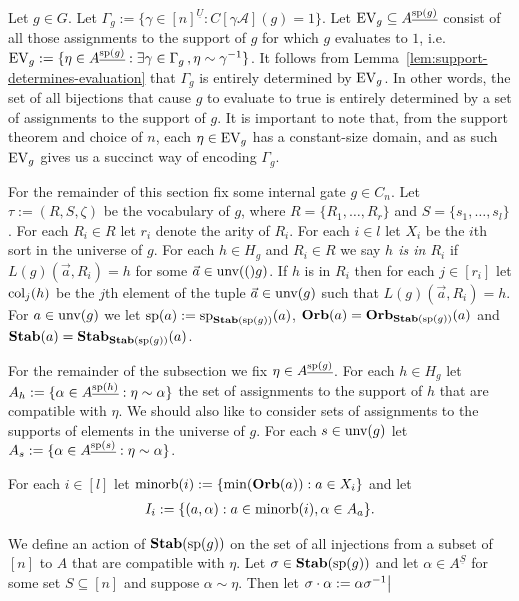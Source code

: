 \documentclass[../main/thesis.tex]{subfiles}
\begin{document}
Let $g \in G$. Let $\Gamma_g:= \{\gamma \in [n]^{\underline{U}} : C[\gamma
\mathcal{A}](g) = 1 \}$. Let $\text{EV}_g \subseteq A^{\underline{\text{sp}(g)}}$ consist
of all those assignments to the support of $g$ for which $g$ evaluates to $1$,
i.e.\ $\text{EV}_g := \{ \eta \in A^{\underline{\text{sp}(g)}} : \exists \gamma \in
\Gamma_g \, ,\eta \sim \gamma^{-1}\}$. It follows from
Lemma~\ref{lem:support-determines-evaluation} that $\Gamma_g$ is entirely
determined by $\text{EV}_g$. In other words, the set of all bijections that cause $g$
to evaluate to true is entirely determined by a set of assignments to the
support of $g$. It is important to note that, from the support theorem and
choice of $n$, each $\eta \in \text{EV}_g$ has a constant-size domain, and as such
$\text{EV}_g$ gives us a succinct way of encoding $\Gamma_g$.

For the remainder of this section fix some internal gate $g \in C_n$. Let $\tau
:= (R, S, \zeta)$ be the vocabulary of $g$, where $R = \{R_1, \ldots, R_r\}$ and
$S = \{s_1, \ldots, s_l\}$. For each $R_i \in R$ let $r_i$ denote the arity of
$R_i$. For each $i \in l$ let $X_i$ be the $i$th sort in the universe of $g$.
For each $h \in H_g$ and $R_i \in R$ we say \emph{$h$ is in $R_i$} if
$L(g)(\vec{a}, R_i) = h$ for some $\vec{a} \in \text{unv}(()g)$. If $h$ is in $R_i$
then for each $j \in [r_i]$ let $\text{\upshape col}_{j}(h)$ be the $j$th element of the tuple
$\vec{a} \in \text{unv}(g)$ such that $L(g)(\vec{a}, R_i) = h$. For $a \in
\text{unv}(g)$ we let $\text{sp}(a) := \text{sp}_{\text{\textbf{Stab}} (\text{sp} (g))}(a)$, $\text{\textbf{Orb}}(a) =
\text{\textbf{Orb}}_{\text{\textbf{Stab}} (\text{sp} (g))}(a)$ and $\text{\textbf{Stab}}(a) = \text{\textbf{Stab}}_{\text{\textbf{Stab}} (\text{sp} (g))}(a)$.

For the remainder of the subsection we fix $\eta \in A^{\underline{\text{sp}(g)}}$.
For each $h \in H_g$ let $A_h := \{\alpha \in A^{\underline{\text{sp}(h)}} : \eta
\sim \alpha\}$ the set of assignments to the support of $h$ that are compatible
with $\eta$. We should also like to consider sets of assignments to the supports
of elements in the universe of $g$. For each $s \in \text{unv}(g)$ let $A_s :=
\{\alpha \in A^{\underline{\text{sp}(s)}} : \eta \sim \alpha\}$.

For each $i \in [l]$ let $\text{\upshape minorb}(i) := \{\min (\text{\textbf{Orb}}(a)) : a \in X_i\}$ and let
\begin{align*}
	I_{i} := \{(a, \alpha): a \in \text{\upshape minorb}(i), \alpha \in A_a\}.
\end{align*}

We define an action of $\text{\textbf{Stab}} (\text{sp} (g))$ on the set of all injections from a subset
of $[n]$ to $A$ that are compatible with $\eta$. Let $\sigma \in \text{\textbf{Stab}} (\text{sp} (g))$ and
let $\alpha \in A^{\underline{S}}$ for some set $S \subseteq [n]$ and suppose
$\alpha \sim \eta$. Then let $\sigma \cdot \alpha := \alpha
\restr{\sigma^{-1}}{}$
\end{document}
